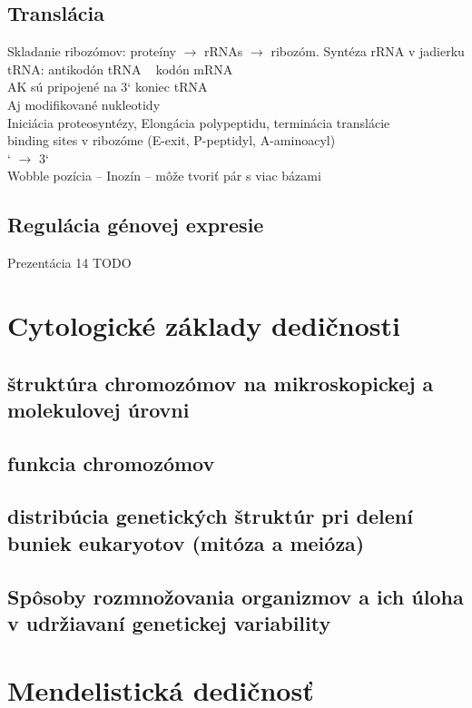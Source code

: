 \subsection*{Translácia}
\tab Skladanie ribozómov: proteíny $\rightarrow$ rRNAs $\rightarrow$ ribozóm. Syntéza rRNA v jadierku\\
\tab tRNA: \tab antikodón tRNA ~ kodón mRNA\\
\tab \tab AK sú pripojené na 3` koniec tRNA\\
\tab \tab Aj modifikované nukleotidy\\
\tab \tab Iniciácia proteosyntézy, Elongácia polypeptidu, terminácia translácie\\
 binding sites v ribozóme (E-exit, P-peptidyl, A-aminoacyl)\\
` $\rightarrow$ 3`\\
\tab Wobble pozícia -- Inozín -- môže tvoriť pár s viac bázami\\
\subsection*{Regulácia génovej expresie}
\tab Prezentácia 14 TODO\\

\section{Cytologické základy dedičnosti}
\subsection*{štruktúra chromozómov na mikroskopickej a molekulovej úrovni}
\subsection*{funkcia chromozómov}
\subsection*{distribúcia genetických štruktúr pri delení buniek eukaryotov (mitóza a meióza)}
\subsection*{Spôsoby rozmnožovania organizmov a ich úloha v udržiavaní genetickej variability}

\section{Mendelistická dedičnosť}
